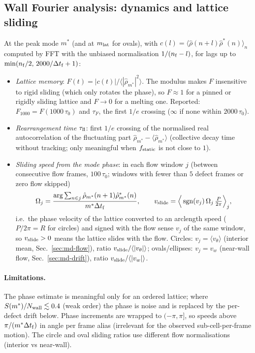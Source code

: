 \subsection{Wall Fourier analysis: dynamics and lattice sliding}
\label{sec:md-fourier-dyn}

At the peak mode $m^*$ (and at $m_{\rm lat}$ for ovals), with $c(l)=\langle\hat\rho(n+l)\hat\rho^*(n)\rangle_n$ computed by FFT with the
unbiased normalisation $1/(n_{\rm f}-l)$, for lags up to $\min(n_{\rm f}/2,\,2000/\Delta t_{\rm f}+1)$:
\begin{itemize}
\item \emph{Lattice memory}: $F(t)=|c(t)|/\langle|\hat\rho_{m^*}|^2\rangle$. The modulus makes $F$ insensitive to rigid sliding (which only
  rotates the phase), so $F\approx1$ for a pinned or rigidly sliding lattice and $F\to0$ for a melting one. Reported: $F_{1000}=F(1000\,\tau_0)$
  and $\tau_F$, the first $1/e$ crossing ($\infty$ if none within $2000\,\tau_0$).
\item \emph{Rearrangement time} $\tau_{\rm fl}$: first $1/e$ crossing of the normalised real autocorrelation of the fluctuating part
  $\hat\rho_{m^*}-\langle\hat\rho_{m^*}\rangle$ (collective decay time without tracking; only meaningful when $f_{\rm static}$ is not close to $1$).
\item \emph{Sliding speed from the mode phase}: in each flow window $j$ (between consecutive flow frames, $100\,\tau_0$; windows with fewer than
  $5$ defect frames or zero flow skipped)
  \begin{equation}
    \Omega_j=\frac{\arg\sum_{n\in j}\hat\rho_{m^*}(n+1)\hat\rho^*_{m^*}(n)}{m^*\Delta t_{\rm f}},\qquad
    v_{\rm slide}=\Big\langle\operatorname{sgn}(v_j)\,\Omega_j\,\tfrac{P}{2\pi}\Big\rangle_j ,
  \end{equation}
  i.e.\ the phase velocity of the lattice converted to an arclength speed ($P/2\pi=R$ for circles) and signed with the flow sense $v_j$ of the
  same window, so $v_{\rm slide}>0$ means the lattice slides with the flow. Circles: $v_j=\langle v_\theta\rangle$ (interior mean,
  Sec.~\ref{sec:md-flow}), ratio $v_{\rm slide}/\langle|v_\theta|\rangle$; ovals/ellipses: $v_j=v_w$ (near-wall flow, Sec.~\ref{sec:md-drift}),
  ratio $v_{\rm slide}/\langle|v_w|\rangle$.
\end{itemize}
\paragraph{Limitations.} The phase estimate is meaningful only for an ordered lattice; where $S(m^*)/N_{\rm wall}\lesssim0.4$ (weak order) the
phase is noise and is replaced by the per-defect drift below. Phase increments are wrapped to $(-\pi,\pi]$, so speeds above
$\pi/(m^*\Delta t_{\rm f})$ in angle per frame alias (irrelevant for the observed sub-cell-per-frame motion).
The circle and oval sliding ratios use different flow normalisations (interior vs near-wall).

